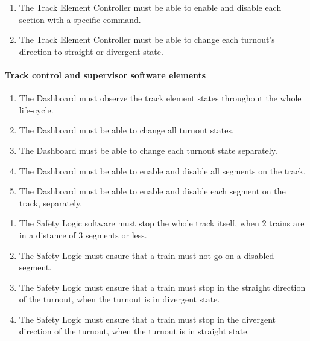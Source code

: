 \begin{enumerate}[label=REQ-TEC-\arabic*, leftmargin=*, format=\small]
	\item The Track Element Controller must be able to enable and disable each section with a specific command. \label{req:TEC-1}
	\item The Track Element Controller must be able to change each turnout's direction to straight or divergent state. \label{req:TEC-2}
\end{enumerate}

\paragraph{Track control and supervisor software elements}
\begin{enumerate}[label=REQ-DB-\arabic*, leftmargin=*, format=\small]
	\item The Dashboard must observe the track element states throughout the whole life-cycle. \label{req:DB-1}
	\item The Dashboard must be able to change all turnout states. \label{req:DB-2}
	\item The Dashboard must be able to change each turnout state separately. \label{req:DB-3}
	\item The Dashboard must be able to enable and disable all segments on the track. \label{req:DB-4}
	\item The Dashboard must be able to enable and disable each segment on the track, separately. \label{req:DB-5}
\end{enumerate}

\begin{enumerate}[label=REQ-SL-\arabic*, leftmargin=*, format=\small]
	\item The Safety Logic software must stop the whole track itself, when 2 trains are in a distance of 3 segments or less. \label{req:SL-1}
	\item The Safety Logic must ensure that a train must not go on a disabled segment. \label{req:SL-2}
	\item The Safety Logic must ensure that a train must stop in the straight direction of the turnout, when the turnout is in divergent state. \label{req:SL-3}
	\item The Safety Logic must ensure that a train must stop in the divergent direction of the turnout, when the turnout is in straight state. \label{req:SL-4}
\end{enumerate}
